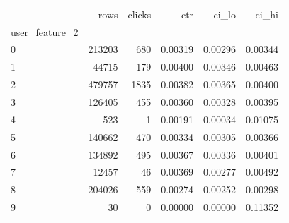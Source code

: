 \begin{tabular}{lrrrrr}
\toprule
 & rows & clicks & ctr & ci\_lo & ci\_hi \\
user\_feature\_2 &  &  &  &  &  \\
\midrule
0 & 213203 & 680 & 0.00319 & 0.00296 & 0.00344 \\
1 & 44715 & 179 & 0.00400 & 0.00346 & 0.00463 \\
2 & 479757 & 1835 & 0.00382 & 0.00365 & 0.00400 \\
3 & 126405 & 455 & 0.00360 & 0.00328 & 0.00395 \\
4 & 523 & 1 & 0.00191 & 0.00034 & 0.01075 \\
5 & 140662 & 470 & 0.00334 & 0.00305 & 0.00366 \\
6 & 134892 & 495 & 0.00367 & 0.00336 & 0.00401 \\
7 & 12457 & 46 & 0.00369 & 0.00277 & 0.00492 \\
8 & 204026 & 559 & 0.00274 & 0.00252 & 0.00298 \\
9 & 30 & 0 & 0.00000 & 0.00000 & 0.11352 \\
\bottomrule
\end{tabular}
